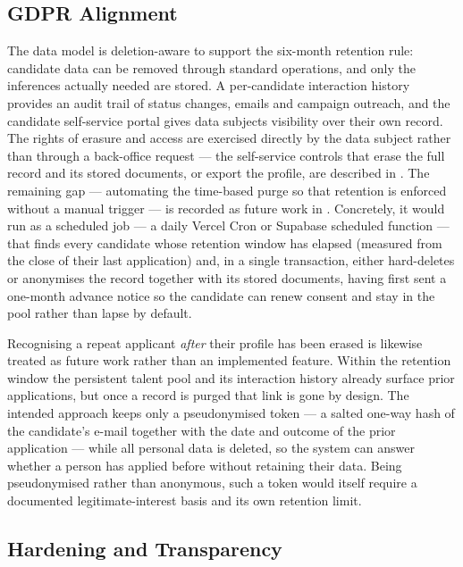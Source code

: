 \subsection{GDPR Alignment}
\label{sec:design-gdpr}

The data model is deletion-aware to support the six-month retention rule:
candidate data can be removed through standard operations, and only the
inferences actually needed are stored. A per-candidate interaction history
provides an audit trail of status changes, emails and campaign outreach, and
the candidate self-service portal gives data subjects visibility over their
own record. The rights of erasure and access are exercised directly by the
data subject rather than through a back-office request --- the self-service
controls that erase the full record and its stored documents, or export the
profile, are described in . The remaining gap --- automating
the time-based purge so that retention is enforced without a manual trigger
--- is recorded as future work in . Concretely, it
would run as a scheduled job --- a daily Vercel Cron or Supabase scheduled
function --- that finds every candidate whose retention window has elapsed
(measured from the close of their last application) and, in a single
transaction, either hard-deletes or anonymises the record together with its
stored documents, having first sent a one-month advance notice so the candidate
can renew consent and stay in the pool rather than lapse by default.

Recognising a repeat applicant \emph{after} their profile has been erased is
likewise treated as future work rather than an implemented feature. Within the
retention window the persistent talent pool and its interaction history already
surface prior applications, but once a record is purged that link is gone by
design. The intended approach keeps only a pseudonymised token --- a salted
one-way hash of the candidate's e-mail together with the date and outcome of
the prior application --- while all personal data is deleted, so the system can
answer whether a person has applied before without retaining their data. Being
pseudonymised rather than anonymous, such a token would itself require a
documented legitimate-interest basis and its own retention limit.

\subsection{Hardening and Transparency}
\label{sec:design-hardening}

